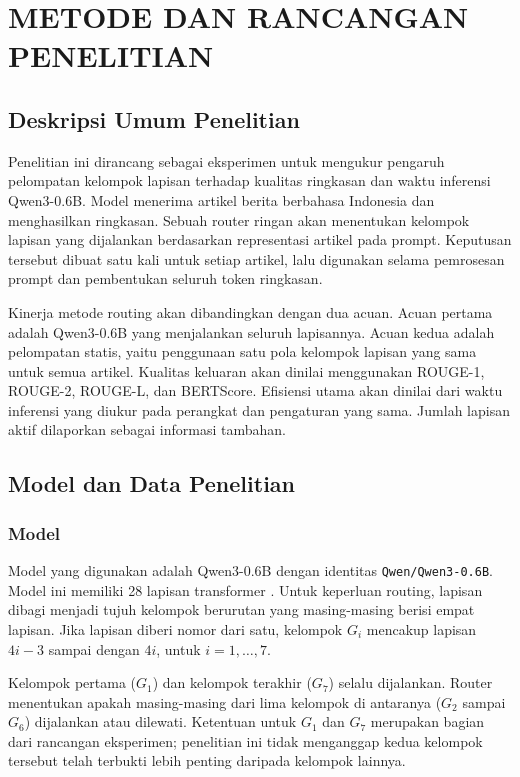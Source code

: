 \chapter{METODE DAN RANCANGAN PENELITIAN}

\section{Deskripsi Umum Penelitian}

Penelitian ini dirancang sebagai eksperimen untuk mengukur pengaruh pelompatan kelompok lapisan terhadap kualitas ringkasan dan waktu inferensi Qwen3-0.6B. Model menerima artikel berita berbahasa Indonesia dan menghasilkan ringkasan. Sebuah router ringan akan menentukan kelompok lapisan yang dijalankan berdasarkan representasi artikel pada prompt. Keputusan tersebut dibuat satu kali untuk setiap artikel, lalu digunakan selama pemrosesan prompt dan pembentukan seluruh token ringkasan.

Kinerja metode routing akan dibandingkan dengan dua acuan. Acuan pertama adalah Qwen3-0.6B yang menjalankan seluruh lapisannya. Acuan kedua adalah pelompatan statis, yaitu penggunaan satu pola kelompok lapisan yang sama untuk semua artikel. Kualitas keluaran akan dinilai menggunakan ROUGE-1, ROUGE-2, ROUGE-L, dan BERTScore. Efisiensi utama akan dinilai dari waktu inferensi yang diukur pada perangkat dan pengaturan yang sama. Jumlah lapisan aktif dilaporkan sebagai informasi tambahan.

\section{Model dan Data Penelitian}

\subsection{Model}

Model yang digunakan adalah Qwen3-0.6B dengan identitas \texttt{Qwen/\allowbreak Qwen3-0.6B}. Model ini memiliki 28 lapisan transformer \citep{qwen2025modelcard}. Untuk keperluan routing, lapisan dibagi menjadi tujuh kelompok berurutan yang masing-masing berisi empat lapisan. Jika lapisan diberi nomor dari satu, kelompok $G_i$ mencakup lapisan $4i-3$ sampai dengan $4i$, untuk $i=1,\ldots,7$.

Kelompok pertama ($G_1$) dan kelompok terakhir ($G_7$) selalu dijalankan. Router menentukan apakah masing-masing dari lima kelompok di antaranya ($G_2$ sampai $G_6$) dijalankan atau dilewati. Ketentuan untuk $G_1$ dan $G_7$ merupakan bagian dari rancangan eksperimen; penelitian ini tidak menganggap kedua kelompok tersebut telah terbukti lebih penting daripada kelompok lainnya.

